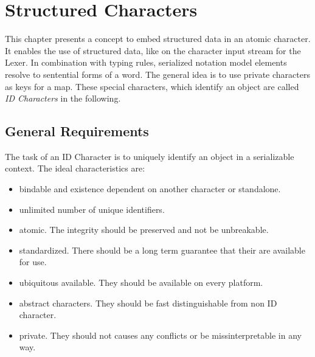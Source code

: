 \section{Structured Characters}
This chapter presents a concept to embed structured data in an atomic character. It enables the use of structured data, like  on the character input stream for the Lexer. In combination with typing rules, serialized notation model elements resolve to sentential forms of a word. The general idea is to use private characters as keys for a map. These special characters, which identify an object are called \emph{ID Characters} in the following.

\subsection{General Requirements}
The task of an ID Character is to uniquely identify an object in a serializable context. 
The ideal characteristics are:
\begin{itemize}
	\item bindable and existence dependent on another character or standalone.
	\item unlimited number of unique identifiers.
	\item atomic. The integrity should be preserved and not be unbreakable.
	\item standardized. There should be a long term guarantee that their are available for use.
	\item ubiquitous available. They should be available on every platform.
	\item abstract characters. They should be fast distinguishable from non ID character.
	\item private. They should not causes any conflicts or be missinterpretable in any way.
\end{itemize}


